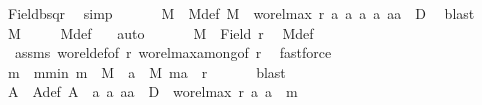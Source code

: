 \begin{isabellebody}
\ Field{\isacharunderscore}{\kern0pt}bsqr\ \isamarkupfalse%
\ simp\isanewline
\ \ \isanewline
\ \ \isamarkupfalse%
\ M\ \ M{\isacharunderscore}{\kern0pt}def{\isacharcolon}{\kern0pt}\ {\isachardoublequoteopen}M\ {\isacharequal}{\kern0pt}\ {\isacharbraceleft}{\kern0pt}wo{\isacharunderscore}{\kern0pt}rel{\isachardot}{\kern0pt}max{}\ r\ a{}\ a{}{\isacharbar}{\kern0pt}\ a{}\ a{}{\isachardot}{\kern0pt}\ {\isacharparenleft}{\kern0pt}a{}{\isacharcomma}{\kern0pt}a{}{\isacharparenright}{\kern0pt}\ {\isasymin}\ D{\isacharbraceright}{\kern0pt}{\isachardoublequoteclose}\ \isamarkupfalse%
\ blast\isanewline
\ \ \isamarkupfalse%
\ {\isachardoublequoteopen}M\ {\isasymnoteq}\ {\isacharbraceleft}{\kern0pt}{\isacharbraceright}{\kern0pt}{\isachardoublequoteclose}\ \isamarkupfalse%
\ {}\ M{\isacharunderscore}{\kern0pt}def\ {\isacharasterisk}{\kern0pt}{\isacharasterisk}{\kern0pt}\ \isamarkupfalse%
\ auto\isanewline
\ \ \isamarkupfalse%
\isanewline
\ \ \isamarkupfalse%
\ {\isachardoublequoteopen}M\ {\isasymle}\ Field\ r{\isachardoublequoteclose}\ \isamarkupfalse%
\ M{\isacharunderscore}{\kern0pt}def\isanewline
\ \ \isamarkupfalse%
\ {}\ assms\ wo{\isacharunderscore}{\kern0pt}rel{\isacharunderscore}{\kern0pt}def{\isacharbrackleft}{\kern0pt}of\ r{\isacharbrackright}{\kern0pt}\ wo{\isacharunderscore}{\kern0pt}rel{\isachardot}{\kern0pt}max{}{\isacharunderscore}{\kern0pt}among{\isacharbrackleft}{\kern0pt}of\ r{\isacharbrackright}{\kern0pt}\ \isamarkupfalse%
\ fastforce\isanewline
\ \ \isamarkupfalse%
\ \isamarkupfalse%
\ m\ \ m{\isacharunderscore}{\kern0pt}min{\isacharcolon}{\kern0pt}\ {\isachardoublequoteopen}m\ {\isasymin}\ M\ {\isasymand}\ {\isacharparenleft}{\kern0pt}{\isasymforall}a\ {\isasymin}\ M{\isachardot}{\kern0pt}\ {\isacharparenleft}{\kern0pt}m{\isacharcomma}{\kern0pt}a{\isacharparenright}{\kern0pt}\ {\isasymin}\ r{\isacharparenright}{\kern0pt}{\isachardoublequoteclose}\isanewline
\ \ \isamarkupfalse%
\ {}\ \isamarkupfalse%
\ blast\isanewline
\ \ \isanewline
\ \ \isamarkupfalse%
\ A{}\ \ A{}{\isacharunderscore}{\kern0pt}def{\isacharcolon}{\kern0pt}\ {\isachardoublequoteopen}A{}\ {\isacharequal}{\kern0pt}\ {\isacharbraceleft}{\kern0pt}a{}{\isachardot}{\kern0pt}\ {\isasymexists}a{}{\isachardot}{\kern0pt}\ {\isacharparenleft}{\kern0pt}a{}{\isacharcomma}{\kern0pt}a{}{\isacharparenright}{\kern0pt}\ {\isasymin}\ D\ {\isasymand}\ wo{\isacharunderscore}{\kern0pt}rel{\isachardot}{\kern0pt}max{}\ r\ a{}\ a{}\ {\isacharequal}{\kern0pt}\ m{\isacharbraceright}{\kern0pt}{\isachardoublequoteclose}\ \isamarkupfalse%

\end{isabellebody}
